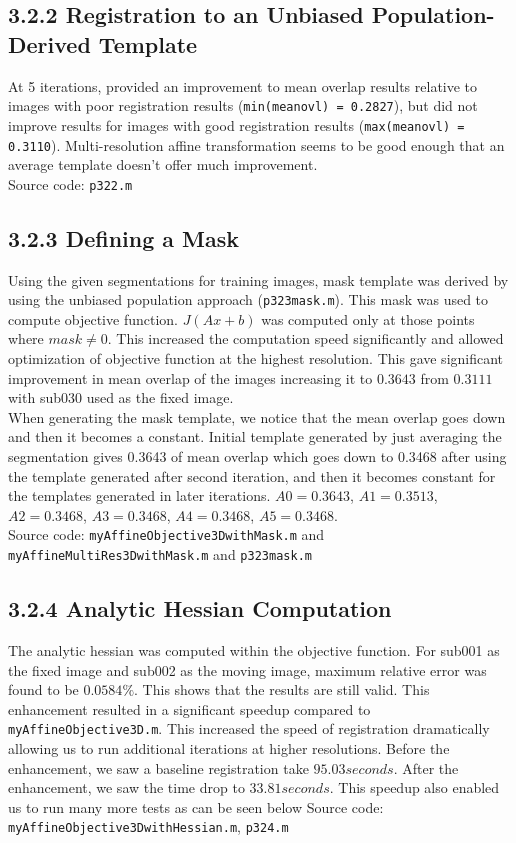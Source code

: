 \documentclass{article}
\begin{document}
\begin{par}
		\subsection*{3.2.2 Registration to an Unbiased Population-Derived Template}
		At 5 iterations, provided an improvement to mean overlap results relative to images with poor registration results (\lstinline|min(meanovl) = 0.2827|), but did not improve results for images with good registration results (\lstinline|max(meanovl) = 0.3110|). Multi-resolution affine transformation seems to be good enough that an average template doesn't offer much improvement.\\
		Source code:  \lstinline|p322.m|		
		
		\subsection*{3.2.3 Defining a Mask}
		Using the given segmentations for training images, mask template was derived by using the unbiased population approach (\lstinline|p323mask.m|). This mask was used to compute objective function. $J(Ax+b)$ was computed only at those points where $mask \neq 0$. This increased the computation speed significantly and allowed optimization of objective function at the highest resolution. This gave significant improvement in mean overlap of the images increasing it to $0.3643$ from $0.3111$ with sub030 used as the fixed image.\\
		When generating the mask template, we notice that the mean overlap goes down and then it becomes a constant. Initial template generated by just averaging the segmentation gives 0.3643 of mean overlap which goes down to 0.3468 after using the template generated after second iteration, and then it becomes constant for the templates generated in later iterations. $A0 = 0.3643$, $A1 = 0.3513$, $A2 = 0.3468$, $A3 = 0.3468$, $A4 = 0.3468$, $A5 = 0.3468$.\\
		Source code: \lstinline|myAffineObjective3DwithMask.m| and \lstinline|myAffineMultiRes3DwithMask.m| and \lstinline|p323mask.m|
		
		
		\subsection*{3.2.4 Analytic Hessian Computation}
		The analytic hessian was computed within the objective function. For sub001 as the fixed image and sub002 as the moving image, maximum relative error was found to be $0.0584\%$. This shows that the results are still valid.  This enhancement resulted in a significant speedup compared to \lstinline|myAffineObjective3D.m|. This increased the speed of registration dramatically allowing us to run additional iterations at higher resolutions. Before the enhancement, we saw a baseline registration take $95.03 seconds$. After the enhancement, we saw the time drop to $33.81 seconds$. This speedup also enabled us to run many more tests as can be seen below
		Source code:  \lstinline|myAffineObjective3DwithHessian.m|,  \lstinline|p324.m| \\\\
		

\end{par}
\end{document}
